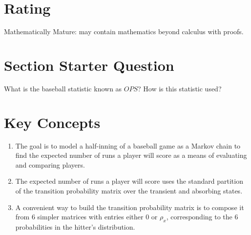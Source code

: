 \documentclass[12pt]{article}
\begin{document}
\myheader \mytitle

\hr


\hr

\usefirefox

\hr



\section*{Rating} %
Mathematically Mature:  may contain mathematics beyond calculus with
proofs.  %

\hr

\section*{Section Starter Question}

What is the baseball statistic known as \( \mathit{OPS} \)?  How is this
statistic used?

\hr

\section*{Key Concepts}

\begin{enumerate}
    \item
        The goal is to model a half-inning of a baseball game as a
        Markov chain to find the expected number of runs a player will
        score as a means of evaluating and comparing players.
    \item
        The expected number of runs a player will score uses the
        standard partition of the transition probability matrix over the
        transient and absorbing states.
    \item
        A convenient way to build the transition probability matrix is
        to compose it from \( 6 \) simpler matrices with entries either \(
        0 \) or \( \rho_x \), corresponding to the \( 6 \) probabilities
        in the hitter's distribution.
\end{enumerate}
\end{document}
